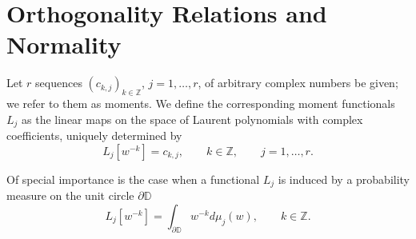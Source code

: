 \documentclass[reqno,centertags,11pt,draft]{amsart}
\newcommand{\Z}{\mathbb{Z}}
\newcommand{\T}{\mathbb{\partial\mathbb{D}}}
\begin{document}


\section{Orthogonality Relations and Normality}\label{ss:normality}

Let $r$ sequences $(c_{k,j})_{k\in\Z}$, $j=1,\ldots,r$, of arbitrary complex numbers be given; we refer to them as moments. We define the corresponding moment functionals $L_j$ as the linear maps on the space of Laurent polynomials with complex coefficients, uniquely determined by
\begin{equation}\label{eq:moments linear functional}
         L_j[w^{-k}] = c_{k,j} , \qquad k\in\Z, \qquad j = 1,\dots,r. 
    \end{equation}

Of special importance is the case when a functional $L_j$ is induced by a probability measure on the unit circle $\T$
\begin{equation}\label{eq:functionals given by measures}
        L_j[w^{-k}] = \int_{\T} w^{-k} d\mu_j(w), \qquad 
        k \in \Z. %
\end{equation}
\end{document}
